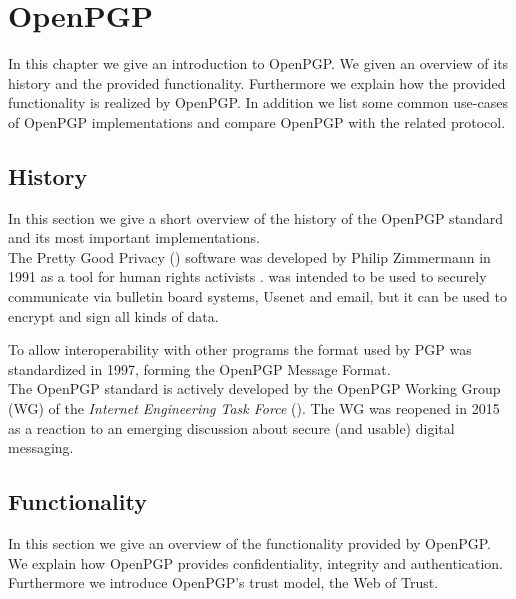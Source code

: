 \chapter{OpenPGP} \label{chapter:openpgp}

In this chapter we give an introduction to OpenPGP. We given an overview of its history and the provided functionality. Furthermore we explain how the provided functionality is realized by OpenPGP. In addition we list some common use-cases of OpenPGP implementations and compare OpenPGP with the related  protocol. 


\section{History}  \label{section:openpgp:history}

In this section we give a short overview of the history of the OpenPGP standard and its most important implementations. \\


The Pretty Good Privacy () software was developed by Philip Zimmermann in 1991 \cite{PGP1} as a tool for human rights activists \cite{PGP2}.  was intended to be used to securely communicate via bulletin board systems, Usenet and email, but it can be used to encrypt and sign all kinds of data.

To allow interoperability with other programs the format used by PGP was standardized in 1997, forming the OpenPGP Message Format. \\


The OpenPGP standard is actively developed by the OpenPGP Working Group (WG) of the \textit{Internet Engineering Task Force} (). The WG was reopened in 2015 as a reaction to an emerging discussion about secure (and usable) digital messaging.

\section{Functionality} \label{section:openpgp:functionality}

In this section we give an overview of the functionality provided by OpenPGP. We explain how OpenPGP provides confidentiality, integrity and authentication. Furthermore we introduce OpenPGP's trust model, the Web of Trust.  \\


